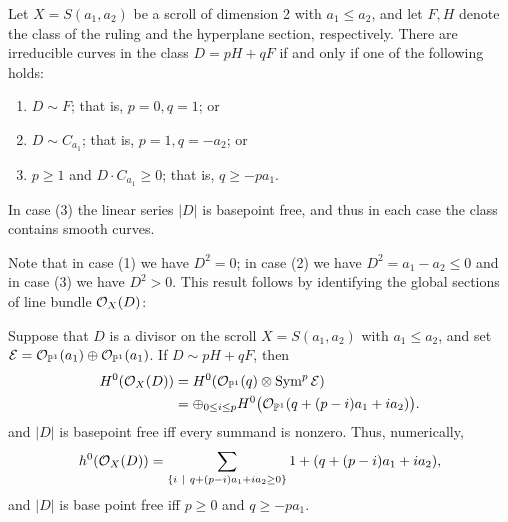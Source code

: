 \begin{theorem}\label{where are the curves?}
 Let $X = S(a_{1}, a_{2})$ be a scroll of dimension 2 with $a_{1}\leq a_{2}$, and let $F,H$ denote the class of the ruling and the hyperplane section, respectively. There are irreducible curves in the class $D = pH+qF$ if and only if one of the following holds:
\begin{enumerate}
\item $D\sim F$; that is, $p=0, q=1$; or
 \item $D\sim C_{a_{1}}$; that is, $p=1, q=-a_{2}$; or
 \item $p\geq 1$ and $D\cdot C_{a_{1}}\geq 0$; that is, $q \geq -pa_{1}.$
\end{enumerate}
In case (3) the linear series $|D|$ is basepoint free, and thus in each case the class contains smooth curves.
\end{theorem}

Note that in case (1) we have $D^{2} = 0$; in case (2) we have $D^{2}= a_{1}-a_{2}\leq 0$ and in case (3) we have $D^{2}>0$.
This result follows by identifying the global sections of line bundle ${\mathcal O}_{X}(D)$:

\begin{theorem}\label{global sections}
Suppose that $D$ is a divisor on the scroll $X = S(a_{1}, a_{2})$ with $a_{1}\leq a_{2}$, and
set ${\mathcal E} = {\mathcal O}_{{\mathbb P}^{1}}(a_{1})\oplus {\mathcal O}_{{\mathbb P}^{1}}(a_{1})$.   If $D \sim pH+qF$, then 
\begin{align*}
 H^{0}({\mathcal O}_{X}(D)) &= H^{0}({\mathcal O}_{{\mathbb P}^{1}}(q) \otimes \operatorname{Sym}^{p} {\mathcal E})\\
 &= 
\oplus_{0\leq i\leq p}H^{0}\bigl({\mathcal O}_{{\mathbb P}^{1}}(q + (p-i)a_{1}+i a_{2})\bigr).
\end{align*}
and $|D|$ is basepoint free iff every summand is nonzero.
Thus, numerically,
$$
h^{0}({\mathcal O}_{X}(D)) = 
\sum_{\{i\ \mid\ q+(p-i)a_{1}+i a_{2} \geq 0\}}1+(q + (p-i)a_{1}+i a_{2}),
$$
and
$|D|$ is base point free iff $p\geq 0$ and $q\geq -pa_{1}$.
\end{theorem}

